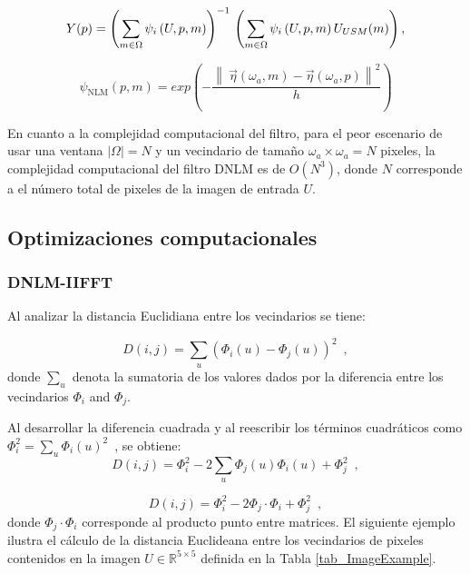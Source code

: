 \begin{equation}
\label{eq:dnlm}
Y(p)=\left(\sum_{m\in \Omega}\psi_{i}\left(U, p, m\right)\right)^{-1} \\ \left(\sum_{m\in \Omega}\psi_{i}\left(U, p, m\right)U_{USM}(m)\right),
\end{equation}


\begin{equation}
	\psi_{\text{NLM}}(p,m) =  exp\left(-\frac{ \left\| \displaystyle\ \overrightarrow{\eta}(\omega_{a},m) - \overrightarrow{\eta}(\omega_{a},p)  \right\|^{2}}{h}\right) 
\end{equation}


En cuanto a la complejidad computacional del filtro, para el peor escenario de usar una ventana $|\Omega| = N$ y un vecindario de tama\~no $\omega_{a} \times \omega_{a} = N$ pixeles, la complejidad computacional del filtro DNLM es de $O(N^3)$, donde $N$ corresponde a el n\'umero total de pixeles de la imagen de entrada $U$. 

\subsection{Optimizaciones computacionales}


\subsubsection{DNLM-IIFFT}

Al analizar la distancia Euclidiana entre los vecindarios se tiene:

\begin{equation}
D\left(i,j\right)=\sum_{u}\left(\varPhi_{i}\left(u\right)-\varPhi_{j}\left(u\right)\right)^{2} \enspace ,
\end{equation}
 donde $\sum_{u}$ denota la sumatoria de los valores dados por la diferencia entre los vecindarios $\varPhi_i$ and $\varPhi_j$.

Al desarrollar la diferencia cuadrada y al reescribir los t\'erminos cuadr\'aticos como $\varPhi_{i}^{2}=\sum_{u}\varPhi_{i}\left(u\right)^{2} \enspace$,  se obtiene: 
\begin{equation}
 D\left(i,j\right)=\varPhi_{i}^{2}-2\sum_{u}\varPhi_{j}\left(u\right)\varPhi_{i}\left(u\right)+\varPhi_{j}^{2}  \enspace ,
 \label{eq_cuadratica}
\end{equation}


\begin{equation}
D\left(i,j\right)=\varPhi_{i}^{2}-2\varPhi_{j}\cdot\varPhi_{i}+\varPhi_{j}^{2} \enspace ,
\end{equation}
donde $\varPhi_{j}\cdot\varPhi_{i}$ corresponde al producto punto entre matrices. El siguiente ejemplo ilustra el c\'alculo de la distancia Euclideana entre los vecindarios de pixeles contenidos en la imagen $U\in\mathbb{R}^{5\times5}$ definida en la Tabla \ref{tab_ImageExample}.


